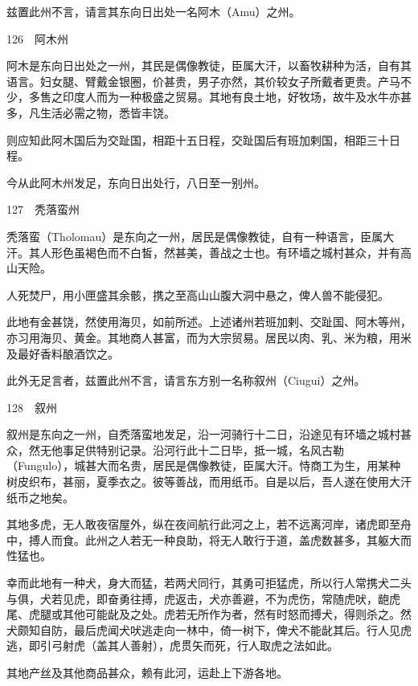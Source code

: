\documentclass[12pt,UTF8]{ctexbook}
\begin{document}
兹置此州不言，请言其东向日出处一名阿木（Amu）之州。





126　阿木州

阿木是东向日出处之一州，其民是偶像教徒，臣属大汗，以畜牧耕种为活，自有其语言。妇女腿、臂戴金银圈，价甚贵，男子亦然，其价较女子所戴者更贵。产马不少，多售之印度人而为一种极盛之贸易。其地有良土地，好牧场，故牛及水牛亦甚多，凡生活必需之物，悉皆丰饶。

则应知此阿木国后为交趾国，相距十五日程，交趾国后有班加剌国，相距三十日程。

今从此阿木州发足，东向日出处行，八日至一别州。





127　秃落蛮州

秃落蛮（Tholomau）是东向之一州，居民是偶像教徒，自有一种语言，臣属大汗。其人形色虽褐色而不白皙，然甚美，善战之士也。有环墙之城村甚众，并有高山天险。

人死焚尸，用小匣盛其余骸，携之至高山山腹大洞中悬之，俾人兽不能侵犯。

此地有金甚饶，然使用海贝，如前所述。上述诸州若班加剌、交趾国、阿木等州，亦习用海贝、黄金。其地商人甚富，而为大宗贸易。居民以肉、乳、米为粮，用米及最好香料酿酒饮之。

此外无足言者，兹置此州不言，请言东方别一名称叙州（Ciugui）之州。





128　叙州

叙州是东向之一州，自秃落蛮地发足，沿一河骑行十二日，沿途见有环墙之城村甚众，然无他事足供特别记录。沿河行此十二日毕，抵一城，名风古勒（Fungulo），城甚大而名贵，居民是偶像教徒，臣属大汗。恃商工为生，用某种树皮织布，甚丽，夏季衣之。彼等善战，而用纸币。自是以后，吾人遂在使用大汗纸币之地矣。

其地多虎，无人敢夜宿屋外，纵在夜间航行此河之上，若不远离河岸，诸虎即至舟中，搏人而食。此州之人若无一种良助，将无人敢行于道，盖虎数甚多，其躯大而性猛也。

幸而此地有一种犬，身大而猛，若两犬同行，其勇可拒猛虎，所以行人常携犬二头与俱，犬若见虎，即奋勇往搏，虎返击，犬亦善避，不为虎伤，常随虎吠，龅虎尾、虎腿或其他可能龀及之处。虎若无所作为者，然有时怒而搏犬，得则杀之。然犬颇知自防，最后虎闻犬吠逃走向一林中，倚一树下，俾犬不能龀其后。行人见虎逃，即引弓射虎（盖其人善射），虎贯矢而死，行人取虎之法如此。

其地产丝及其他商品甚众，赖有此河，运赴上下游各地。
\end{document}
